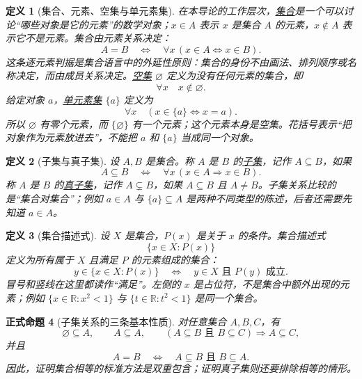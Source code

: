 \documentclass[UTF8,fontset=none,a4paper,11pt]{ctexart}
\theoremstyle{foundation-definition}
\newtheorem{definition}{定义}[section]
\theoremstyle{foundation-theorem}
\theoremstyle{foundation-proposition}
\newtheorem{proposition}[definition]{正式命题}
\theoremstyle{foundation-example}
\theoremstyle{foundation-remark}
\theoremstyle{foundation-theorem}
\newcommand{\term}[2]{\hyperref[#1]{#2}}
\begin{document}
\begin{definition}[集合、元素、空集与单元素集]\label{def:set-membership}
在本导论的工作层次，\term{def:set-membership}{集合}是一个可以讨论“哪些对象是它的元素”的数学对象；\(x\in A\) 表示 \(x\) 是集合 \(A\) 的元素，\(x\notin A\) 表示它不是元素。集合由元素关系决定：
\[
A=B\quad\Longleftrightarrow\quad
\forall x\,(x\in A\Longleftrightarrow x\in B).
\]
这条逐元素判据是集合语言中的外延性原则：集合的身份不由画法、排列顺序或名称决定，而由成员关系决定。\term{def:set-membership}{空集} \(\varnothing\) 定义为没有任何元素的集合，即
\[
\forall x\quad x\notin\varnothing.
\]
给定对象 \(a\)，\term{def:set-membership}{单元素集} \(\{a\}\) 定义为
\[
\forall x\quad (x\in\{a\}\Longleftrightarrow x=a).
\]
所以 \(\varnothing\) 有零个元素，而 \(\{\varnothing\}\) 有一个元素；这个元素本身是空集。花括号表示“把对象作为元素放进去”，不能把 \(a\) 和 \(\{a\}\) 当成同一个对象。
\end{definition}

\begin{definition}[子集与真子集]\label{def:subset}
设 \(A,B\) 是集合。称 \(A\) 是 \(B\) 的\term{def:subset}{子集}，记作 \(A\subseteq B\)，如果
\[
A\subseteq B\quad\Longleftrightarrow\quad
\forall x\,(x\in A\Longrightarrow x\in B).
\]
称 \(A\) 是 \(B\) 的\term{def:subset}{真子集}，记作 \(A\subsetneq B\)，如果 \(A\subseteq B\) 且 \(A\ne B\)。子集关系比较的是“集合对集合”；例如 \(a\in A\) 与 \(\{a\}\subseteq A\) 是两种不同类型的陈述，后者还需要先知道 \(a\in A\)。
\end{definition}

\begin{definition}[集合描述式]\label{def:set-builder-notation}
设 \(X\) 是集合，\(P(x)\) 是关于 \(x\) 的条件。集合描述式
\[
\{x\in X:P(x)\}
\]
定义为所有属于 \(X\) 且满足 \(P\) 的元素组成的集合：
\[
y\in\{x\in X:P(x)\}\quad\Longleftrightarrow\quad
y\in X\text{ 且 }P(y)\text{ 成立}.
\]
冒号和竖线在这里都读作“满足”。左侧的 \(x\) 是占位符，不是集合中额外出现的元素；例如 \(\{x\in\mathbb R:x^2<1\}\) 与 \(\{t\in\mathbb R:t^2<1\}\) 是同一个集合。
\end{definition}

\begin{proposition}[子集关系的三条基本性质]\label{prop:subset-basic-laws}
对任意集合 \(A,B,C\)，有
\[
\varnothing\subseteq A,\qquad A\subseteq A,
\qquad
(A\subseteq B\text{ 且 }B\subseteq C)\Longrightarrow A\subseteq C,
\]
并且
\[
A=B\quad\Longleftrightarrow\quad A\subseteq B\text{ 且 }B\subseteq A.
\]
因此，证明集合相等的标准方法是双重包含；证明真子集则还要排除相等的情形。
\end{proposition}
\end{document}

